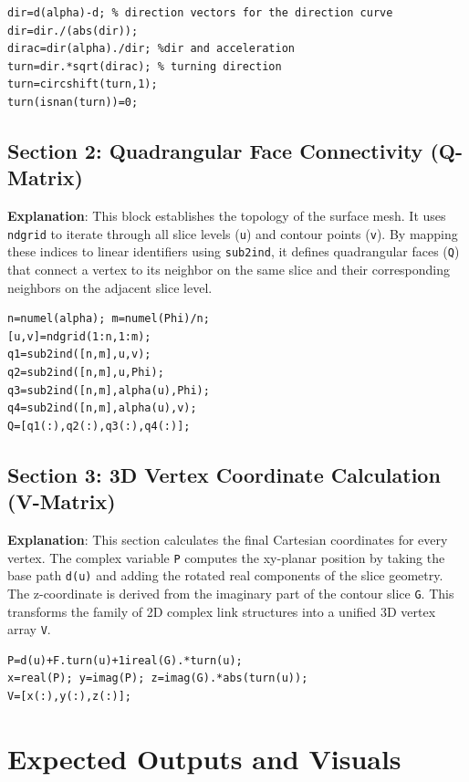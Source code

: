 \begin{lstlisting}
dir=d(alpha)-d; % direction vectors for the direction curve
dir=dir./(abs(dir));
dirac=dir(alpha)./dir; %dir and acceleration
turn=dir.*sqrt(dirac); % turning direction
turn=circshift(turn,1);
turn(isnan(turn))=0;
\end{lstlisting}

\subsection{Section 2: Quadrangular Face Connectivity (Q-Matrix)}
\textbf{Explanation}: This block establishes the topology of the surface mesh. It uses \texttt{ndgrid} to iterate through all slice levels (\texttt{u}) and contour points (\texttt{v}). By mapping these indices to linear identifiers using \texttt{sub2ind}, it defines quadrangular faces (\texttt{Q}) that connect a vertex to its neighbor on the same slice and their corresponding neighbors on the adjacent slice level.

\begin{lstlisting}
n=numel(alpha); m=numel(Phi)/n;
[u,v]=ndgrid(1:n,1:m);
q1=sub2ind([n,m],u,v);
q2=sub2ind([n,m],u,Phi);
q3=sub2ind([n,m],alpha(u),Phi);
q4=sub2ind([n,m],alpha(u),v);
Q=[q1(:),q2(:),q3(:),q4(:)];
\end{lstlisting}

\subsection{Section 3: 3D Vertex Coordinate Calculation (V-Matrix)}
\textbf{Explanation}: This section calculates the final Cartesian coordinates for every vertex. The complex variable \texttt{P} computes the xy-planar position by taking the base path \texttt{d(u)} and adding the rotated real components of the slice geometry. The z-coordinate is derived from the imaginary part of the contour slice \texttt{G}. This transforms the family of 2D complex link structures into a unified 3D vertex array \texttt{V}.

\begin{lstlisting}
P=d(u)+F.turn(u)+1ireal(G).*turn(u);
x=real(P); y=imag(P); z=imag(G).*abs(turn(u));
V=[x(:),y(:),z(:)];
\end{lstlisting}

\section{Expected Outputs and Visuals}

